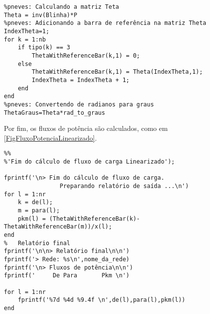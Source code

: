 \begin{verbatim}
%pneves: Calculando a matriz Teta
Theta = inv(Blinha)*P
%pneves: Adicionando a barra de referência na matriz Theta
IndexTheta=1;
for k = 1:nb
    if tipo(k) == 3
        ThetaWithReferenceBar(k,1) = 0;
    else
        ThetaWithReferenceBar(k,1) = Theta(IndexTheta,1);
        IndexTheta = IndexTheta + 1;
    end
end
%pneves: Convertendo de radianos para graus
ThetaGraus=Theta*rad_to_graus
\end{verbatim}
Por fim, os fluxos de potência são calculados, como em \ref{FigFluxoPotenciaLinearizado}.
\begin{verbatim}
%%
%'Fim do cálculo de fluxo de carga Linearizado');
 
fprintf('\n> Fim do cálculo de fluxo de carga.
                Preparando relatório de saída ...\n')
for l = 1:nr
    k = de(l);
    m = para(l);
    pkm(l) = (ThetaWithReferenceBar(k)- ThetaWithReferenceBar(m))/x(l);
end
%	Relatório final
fprintf('\n\n> Relatório final\n\n')
fprintf('> Rede: %s\n',nome_da_rede)
fprintf('\n> Fluxos de potência\n\n')
fprintf('     De Para       Pkm \n')

for l = 1:nr
	fprintf('%7d %4d %9.4f \n',de(l),para(l),pkm(l))
end

\end{verbatim}